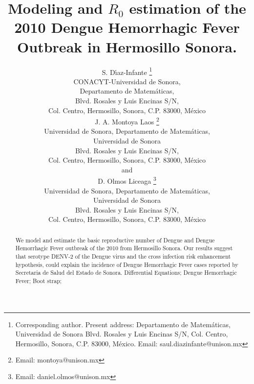 \documentclass[11pt]{imammb}
\numberwithin{equation}{section}
\begin{document}
    \title{
        Modeling and $R_0$ estimation  of the 2010 Dengue Hemorrhagic Fever
        Outbreak in Hermosillo Sonora.
    }
    \author{%
        {\sc S. D\'{\i}az-Infante%
            \footnote{
                Corresponding author.
                Present address: Departamento de Matem\'aticas,
                Universidad de Sonora Blvd. Rosales y Luis Encinas S/N,
                Col. Centro, Hermosillo, Sonora, C.P. 83000,
                M\'exico. Email: saul.diazinfante@unison.mx
                }
        }\\[2pt]
        CONACYT-Universidad de Sonora, \\[6pt]
        Departamento de Matem\'aticas, \\[6pt]
        Blvd. Rosales y Luis Encinas S/N, \\[6pt]
        Col. Centro, Hermosillo, Sonora, C.P. 83000,
        M\'exico\\
        {\sc J. A. Montoya Laos
            \footnote{Email: montoya@unison.mx}
        }\\[2pt]
        Universidad de Sonora,
        Departamento de Matem\'aticas, \\[6pt]
        Universidad de Sonora \\[6pt]
        Blvd. Rosales y Luis Encinas S/N, \\[6pt]
        Col. Centro, Hermosillo, Sonora, C.P. 83000,
        M\'exico\\
        { \sc and
            \\
             D. Olmos Liceaga
            \footnote{Email: daniel.olmos@unison.mx}
        }\\[2pt]
        Universidad de Sonora,
        Departamento de Matem\'aticas, \\[6pt]
        Universidad de Sonora \\[6pt]
        Blvd. Rosales y Luis Encinas S/N, \\[6pt]
        Col. Centro, Hermosillo, Sonora, C.P. 83000,
        M\'exico\\
    }
%
    \pagestyle{headings}
    \maketitle
    \begin{abstract}
        {We model and estimate the basic reproductive number of Dengue  and
        Dengue Hemorrhagic Fever outbreak of the 2010 from Hermosillo Sonora.
        Our results suggest that serotype DENV-2 of the Dengue virus and the cross
        infection risk enhancement hypothesis, could explain the incidence of
        Dengue Hemorrhagic Fever cases reported by Secretaria de Salud del Estado de
        Sonora.}
        {Differential Equations;
        Dengue Hemorrhagic Fever;
        Boot strap;}
    \end{abstract}
%
\end{document}
